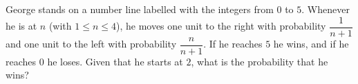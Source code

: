 George stands on a number line labelled with the integers from $0$ to $5$. Whenever he is at $n$ (with $1\le n\le4$), he moves one unit to the right with probability $\dfrac{1}{n+1}$ and one unit to the left with probability $\dfrac{n}{n+1}$. If he reaches $5$ he wins, and if he reaches $0$ he loses. Given that he starts at $2$, what is the probability that he wins?
